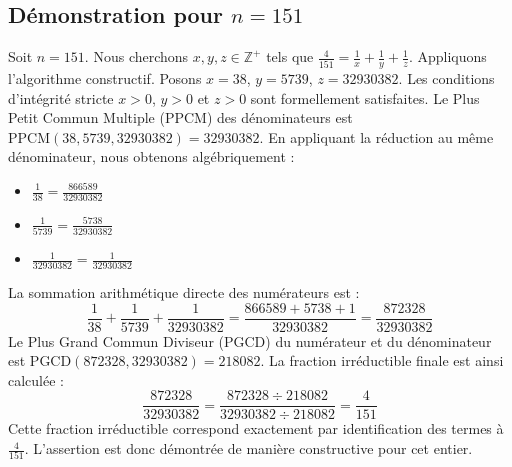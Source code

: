 \documentclass[11pt,a4paper]{article}
\begin{document}
\subsection{Démonstration pour $n = 151$}
Soit $n = 151$. Nous cherchons $x, y, z \in \mathbb{Z}^{+}$ tels que $\frac{4}{151} = \frac{1}{x} + \frac{1}{y} + \frac{1}{z}$.
Appliquons l'algorithme constructif. Posons $x = 38$, $y = 5739$, $z = 32930382$.
Les conditions d'intégrité stricte $x > 0$, $y > 0$ et $z > 0$ sont formellement satisfaites.
Le Plus Petit Commun Multiple (PPCM) des dénominateurs est $\text{PPCM}(38, 5739, 32930382) = 32930382$.
En appliquant la réduction au même dénominateur, nous obtenons algébriquement :
\begin{itemize}
    \item $\frac{1}{38} = \frac{866589}{32930382}$
    \item $\frac{1}{5739} = \frac{5738}{32930382}$
    \item $\frac{1}{32930382} = \frac{1}{32930382}$
\end{itemize}
La sommation arithmétique directe des numérateurs est :
$$ \frac{1}{38} + \frac{1}{5739} + \frac{1}{32930382} = \frac{866589 + 5738 + 1}{32930382} = \frac{872328}{32930382} $$
Le Plus Grand Commun Diviseur (PGCD) du numérateur et du dénominateur est $\text{PGCD}(872328, 32930382) = 218082$.
La fraction irréductible finale est ainsi calculée :
$$ \frac{872328}{32930382} = \frac{872328 \div 218082}{32930382 \div 218082} = \frac{4}{151} $$
Cette fraction irréductible correspond exactement par identification des termes à $\frac{4}{151}$. L'assertion est donc démontrée de manière constructive pour cet entier.
\end{document}

